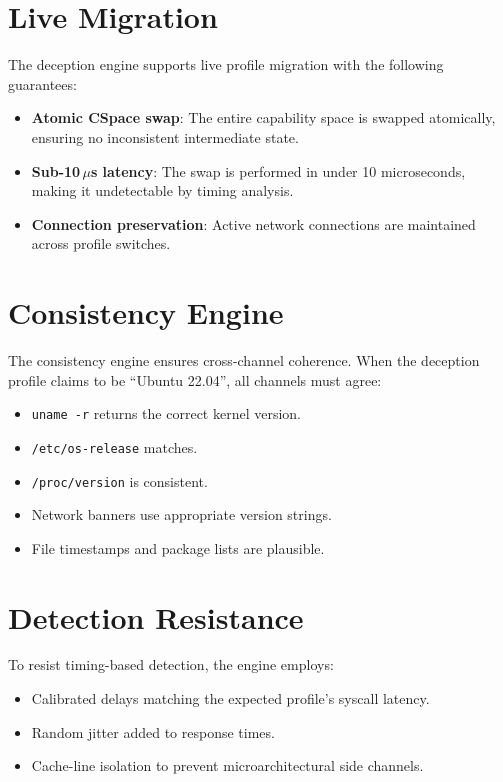 \documentclass[11pt,a4paper,twoside]{report}
\theoremstyle{definition}
\begin{document}
\section{Live Migration}

The deception engine supports live profile migration with the following
guarantees:

\begin{itemize}[leftmargin=1.4em]
  \item \textbf{Atomic CSpace swap}: The entire capability space is swapped
    atomically, ensuring no inconsistent intermediate state.
  \item \textbf{Sub-10\,$\mu$s latency}: The swap is performed in under
    10 microseconds, making it undetectable by timing analysis.
  \item \textbf{Connection preservation}: Active network connections are
    maintained across profile switches.
\end{itemize}

\section{Consistency Engine}

The consistency engine ensures cross-channel coherence. When the deception
profile claims to be ``Ubuntu 22.04'', all channels must agree:

\begin{itemize}[leftmargin=1.4em]
  \item \texttt{uname -r} returns the correct kernel version.
  \item \texttt{/etc/os-release} matches.
  \item \texttt{/proc/version} is consistent.
  \item Network banners use appropriate version strings.
  \item File timestamps and package lists are plausible.
\end{itemize}

\section{Detection Resistance}

To resist timing-based detection, the engine employs:
\begin{itemize}[leftmargin=1.4em]
  \item Calibrated delays matching the expected profile's syscall latency.
  \item Random jitter added to response times.
  \item Cache-line isolation to prevent microarchitectural side channels.
\end{itemize}
\end{document}
